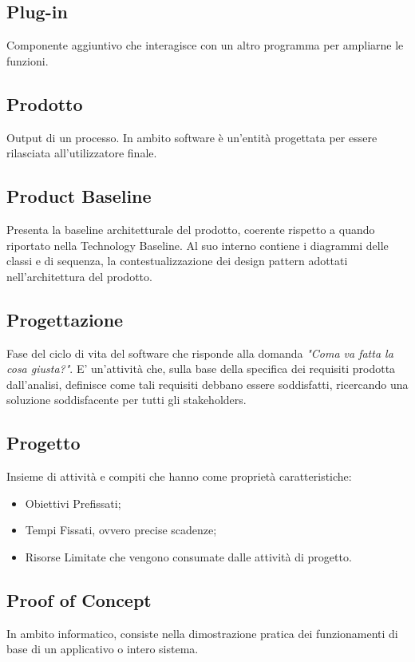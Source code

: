 \subsection{Plug-in} 
Componente aggiuntivo che interagisce con un altro programma per ampliarne le funzioni.

\subsection{Prodotto}
Output di un processo. In ambito software è un'entità progettata per essere rilasciata all'utilizzatore finale.

\subsection{Product Baseline}
Presenta la baseline architetturale del prodotto, coerente rispetto a quando riportato nella Technology Baseline. Al suo interno contiene i diagrammi delle classi e di sequenza, la contestualizzazione dei design pattern adottati nell'architettura del prodotto.

\subsection{Progettazione}
Fase del ciclo di vita del software che risponde alla domanda \textit{"Coma va fatta la cosa giusta?"}. E' un'attività che, sulla base della specifica dei requisiti prodotta dall'analisi, definisce come tali requisiti debbano essere soddisfatti, ricercando una soluzione soddisfacente per tutti gli stakeholders.

\subsection{Progetto}
Insieme di attività e compiti che hanno come proprietà caratteristiche:
\begin{itemize}
	\item Obiettivi Prefissati;
	\item Tempi Fissati, ovvero precise scadenze;
	\item Risorse Limitate che vengono consumate dalle attività di progetto.
\end{itemize}

\subsection{Proof of Concept}
In ambito informatico, consiste nella dimostrazione pratica dei funzionamenti di base di un applicativo o intero sistema.

